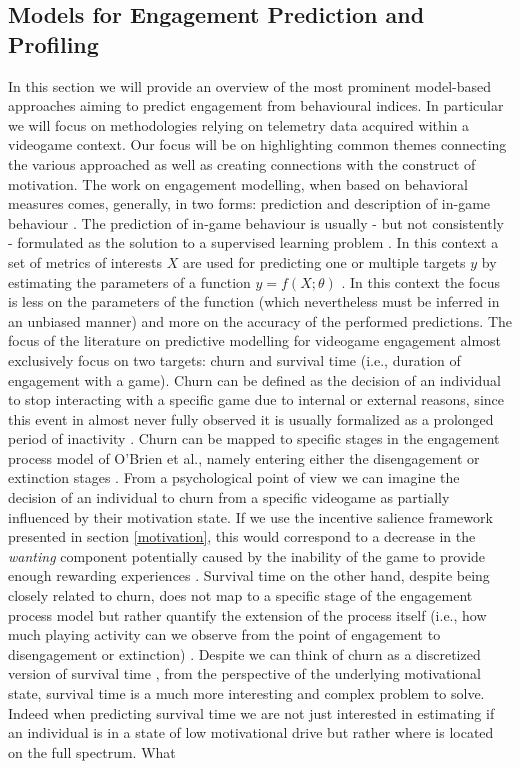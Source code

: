 \subsection{Models for Engagement Prediction and Profiling}
\label{engagement_prediction}
In this section we will provide an overview of the most prominent model-based approaches aiming to predict engagement from behavioural indices. In particular we will focus on methodologies relying on telemetry data acquired within a videogame context. Our focus will be on highlighting common themes connecting the various approached as well as creating connections with the construct of motivation. The work on engagement modelling, when based on behavioral measures comes, generally, in two forms: prediction and description of in-game behaviour \cite{el2016game}. The prediction of in-game behaviour is usually - but not consistently - formulated as the solution to a supervised learning problem \cite{el2016game}. In this context a set of metrics of interests $X$ are used for predicting one or multiple targets $y$ by estimating the parameters of a function $y = f(X; \theta)$ \cite{bishop2006pattern}. In this context the focus is less on the parameters of the function (which nevertheless must be inferred in an unbiased manner) and more on the accuracy of the performed predictions. The focus of the literature on predictive modelling for videogame engagement almost exclusively focus on two targets: churn and survival time (i.e., duration of engagement with a game). Churn can be defined as the decision of an individual to stop interacting with a specific game due to internal or external reasons, since this event in almost never fully observed it is usually formalized as a prolonged period of inactivity \cite{hadiji2014predicting,runge2014churn, drachen2016rapid,milovsevic2017early, kim2017churn}. Churn can be mapped to specific stages in the engagement process model of O'Brien et al., namely entering either the disengagement or extinction stages \cite{o2008user}. From a psychological point of view we can imagine the decision of an individual to churn from a specific videogame as partially influenced by their motivation state. If we use the incentive salience framework presented in section \ref{motivation}, this would correspond to a decrease in the \textit{wanting} component potentially caused by the inability of the game to provide enough rewarding experiences \cite{berridge2004motivation}. Survival time on the other hand, despite being closely related to churn, does not map to a specific stage of the engagement process model but rather quantify the extension of the process itself (i.e., how much playing activity can we observe from the point of engagement to disengagement or extinction) \cite{perianez2016churn, demediuk2018player, bertens2017games, kim2017churn, viljanen2018playtime}. Despite we can think of churn as a discretized version of survival time \cite{el2021game}, from the perspective of the underlying motivational state, survival time is a much more interesting and complex problem to solve. Indeed when predicting survival time we are not just interested in estimating  if an individual is in a state of low motivational drive but rather where is located on the full spectrum. What 